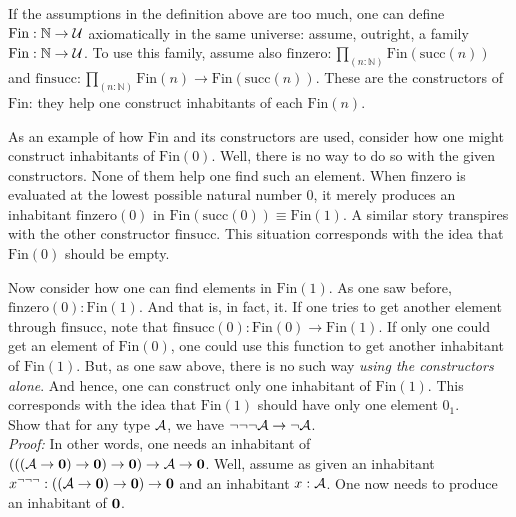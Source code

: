 If the assumptions in the definition above are too much, one can define $\text{Fin} : \mathbb{N} \to \mathcal{U}$ axiomatically in the same universe: assume, outright, a family $\text{Fin} : \mathbb{N} \to \mathcal{U}$. To use this family, assume also $\text{finzero} : \prod_{(n:\mathbb{N})}\text{Fin}(\text{succ}(n))$ and $\text{finsucc} : \prod_{(n:\mathbb{N})}\text{Fin}(n)\to\text{Fin}(\text{succ}(n))$. These are the constructors of $\text{Fin}$: they help one construct inhabitants of each $\text{Fin}(n)$.

As an example of how $\text{Fin}$ and its constructors are used, consider how one might construct inhabitants of $\text{Fin}(0)$. Well, there is no way to do so with the given constructors. None of them help one find such an element. When $\text{finzero}$ is evaluated at the lowest possible natural number $0$, it merely produces an inhabitant $\text{finzero}(0)$ in $\text{Fin}(\text{succ}(0)) \equiv \text{Fin}(1)$. A similar story transpires with the other constructor $\text{finsucc}$. This situation corresponds with the idea that $\text{Fin}(0)$ should be empty.

Now consider how one can find elements in $\text{Fin}(1)$. As one saw before, $\text{finzero}(0) : \text{Fin}(1)$. And that is, in fact, it. If one tries to get another element through $\text{finsucc}$, note that $\text{finsucc}(0) : \text{Fin}(0)\to\text{Fin}(1)$. If only one could get an element of $\text{Fin}(0)$, one could use this function to get another inhabitant of $\text{Fin}(1)$. But, as one saw above, there is no such way \textit{using the constructors alone}. And hence, one can construct only one inhabitant of $\text{Fin}(1)$. This corresponds with the idea that $\text{Fin}(1)$ should have only one element $0_{1}$. \\



 Show that for any type $\mathcal{A}$, we have $\neg\neg\neg \mathcal{A} \to \neg \mathcal{A}$. \\


\textit{Proof:} In other words, one needs an inhabitant of $(((\mathcal{A} \to \textbf{0}) \to \textbf{0}) \to \textbf{0}) \to \mathcal{A} \to \textbf{0}$. Well, assume as given an inhabitant $x^{\neg\neg\neg} : ((\mathcal{A} \to \textbf{0}) \to \textbf{0}) \to \textbf{0}$ and an inhabitant $x : \mathcal{A}$. One now needs to produce an inhabitant of $\textbf{0}$.

